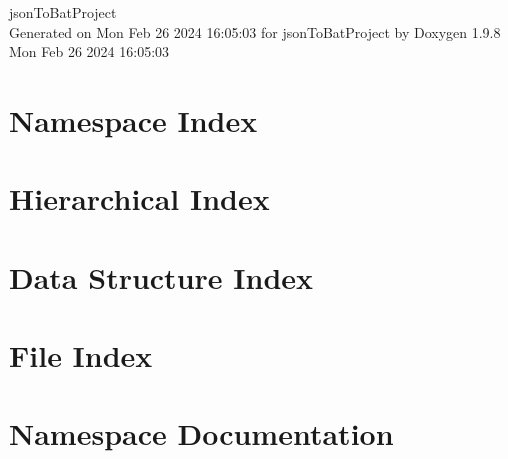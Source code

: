 \documentclass[twoside]{book}
\newcommand{\+}{\discretionary{\mbox{\scriptsize$\hookleftarrow$}}{}{}}
\newcommand{\clearemptydoublepage}{%
    \newpage{\pagestyle{empty}\cleardoublepage}%
  }
\begin{document}
  \raggedbottom
    \hypersetup{pageanchor=false,
                bookmarksnumbered=true,
                pdfencoding=unicode
               }
  \begin{titlepage}
  \vspace*{7cm}
  \begin{center}%
  {\Large json\+To\+Bat\+Project}\\
  \vspace*{1cm}
  {\large Generated on Mon Feb 26 2024 16\+:05\+:03 for json\+To\+Bat\+Project by Doxygen 1.9.8}\\
    \vspace*{0.5cm}
    {\small Mon Feb 26 2024 16:05:03}
  \end{center}
  \end{titlepage}
  \clearemptydoublepage
  \tableofcontents
  \clearemptydoublepage
  \hypersetup{pageanchor=true}



\chapter{Namespace Index}

\chapter{Hierarchical Index}

\chapter{Data Structure Index}

\chapter{File Index}

\chapter{Namespace Documentation}












\end{document}
